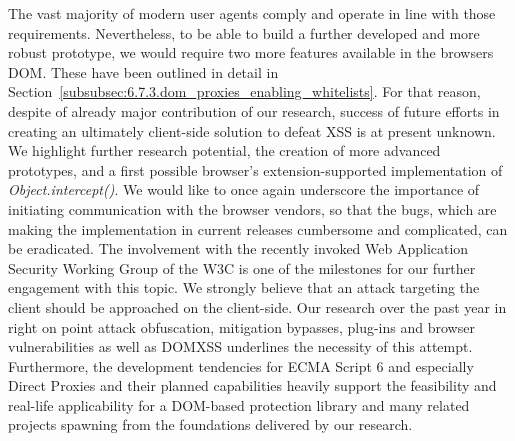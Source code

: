     The vast majority of modern user agents comply and operate in line with those requirements. Nevertheless, to be able to build a further developed and more robust prototype, we would require two more features available in the browsers DOM. These have been outlined in detail in Section~\ref{subsubsec:6.7.3.dom_proxies_enabling_whitelists}. For that reason, despite of already major contribution of our research, success of future efforts in creating an ultimately client-side solution to defeat XSS is at present unknown. We highlight further research potential, the creation of more advanced prototypes, and a first possible browser's extension-supported implementation of \textit{Object.intercept()}. We would like to once again underscore the importance of initiating communication with the browser vendors, so that the bugs, which are making the implementation in current releases cumbersome and complicated, can be eradicated. The involvement with the recently invoked Web Application Security Working Group of the W3C is one of the milestones for our further engagement with this topic. We strongly believe that an attack targeting the client should be approached on the client-side. Our research over the past year in right on point attack obfuscation, mitigation bypasses, plug-ins and browser vulnerabilities as well as DOMXSS underlines the necessity of this attempt. Furthermore, the development tendencies for ECMA Script 6 and especially Direct Proxies and their planned capabilities heavily support the feasibility and real-life applicability for a DOM-based protection library and many related projects spawning from the foundations delivered by our research.